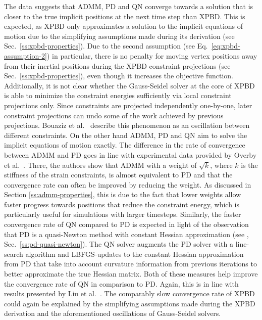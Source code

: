 The data suggests that ADMM, PD and QN converge towards a solution that is closer to the true implicit positions at the next time step than XPBD. This is expected, 
as XPBD only approximates a solution to the implicit equations of motion due to the simplifying assumptions made during its derivation (see Sec.\ \ref{ss:xpbd-properties}).
Due to the second assumption (see Eq.\ \ref{eq:xpbd-assumption-2}) in particular, there is no penalty for moving vertex positions away from their inertial positions during 
the XPBD constraint projections (see Sec.\ \ref{ss:xpbd-properties}), even though it increases the objective function. Additionally,
it is not clear whether the Gauss-Seidel solver at the core of XPBD is able to minimize the constraint energies sufficiently via local constraint projections only.
Since constraints are projected independently one-by-one, later constraint projections can undo some of the work achieved by previous projections. Bouaziz et al.\ 
\cite{bouaziz2014} describe this phenomenon as an oscillation between different constraints. On the other hand ADMM, PD and QN aim to solve the implicit equations 
of motion exactly. The difference in the rate of convergence between ADMM and PD goes in line 
with experimental data provided by Overby et al.\ \cite{overby2017}. There, the authors show that ADMM with a weight of $\sqrt{k}$, where $k$ is the stiffness of the 
strain constraints, is almost equivalent to PD and that the convergence rate can often be improved by reducing the weight. As discussed in 
Section \ref{ss:admm-properties}, this is due to the fact that lower weights allow faster progress towards positions that reduce the constraint energy, which is particularly 
useful for simulations with larger timesteps. Similarly, the faster convergence rate of QN compared to PD is expected in light of the observation that PD is a quasi-Newton method 
with constant Hessian approximation (see \cite{liu2017}, Sec.\ \ref{ss:pd-quasi-newton}). The QN solver augments the PD solver with a line-search algorithm and LBFGS-updates to 
the constant Hessian approximation from PD that take into account curvature information from previous iterations to better approximate the true Hessian matrix. Both
of these measures help improve the convergence rate of QN in comparison to PD. Again, this is in line with results presented by Liu et al.\ \cite{liu2017}. The comparably
slow convergence rate of XPBD could again be explained by the simplifying assumptions made during the XPBD derivation and the aforementioned oscillations of Gauss-Seidel
solvers. 

